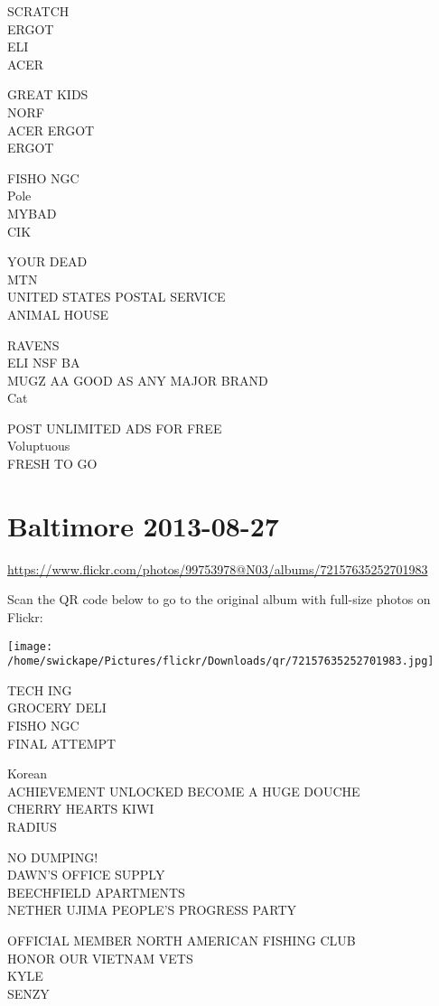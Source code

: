 \documentclass[10pt,letterpaper]{article}
\begin{document}
SCRATCH\\
ERGOT\\
ELI\\
ACER

GREAT KIDS\\
NORF\\
ACER ERGOT\\
ERGOT

FISHO NGC\\
Pole\\
MYBAD\\
CIK

YOUR DEAD\\
MTN\\
UNITED STATES POSTAL SERVICE\\
ANIMAL HOUSE

RAVENS\\
ELI NSF BA\\
MUGZ AA GOOD AS ANY MAJOR BRAND\\
Cat

POST UNLIMITED ADS FOR FREE\\
Voluptuous\\
FRESH TO GO


\section*{Baltimore 2013-08-27}

\url{https://www.flickr.com/photos/99753978@N03/albums/72157635252701983}

Scan the QR code below to go to the original album with full-size photos on Flickr:

\texttt{[image: /home/swickape/Pictures/flickr/Downloads/qr/72157635252701983.jpg]}


TECH ING\\
GROCERY DELI\\
FISHO NGC\\
FINAL ATTEMPT

Korean\\
ACHIEVEMENT UNLOCKED BECOME A HUGE DOUCHE\\
CHERRY HEARTS KIWI\\
RADIUS

NO DUMPING!\\
DAWN'S OFFICE SUPPLY\\
BEECHFIELD APARTMENTS\\
NETHER UJIMA PEOPLE'S PROGRESS PARTY

OFFICIAL MEMBER NORTH AMERICAN FISHING CLUB\\
HONOR OUR VIETNAM VETS\\
KYLE\\
SENZY
\end{document}
